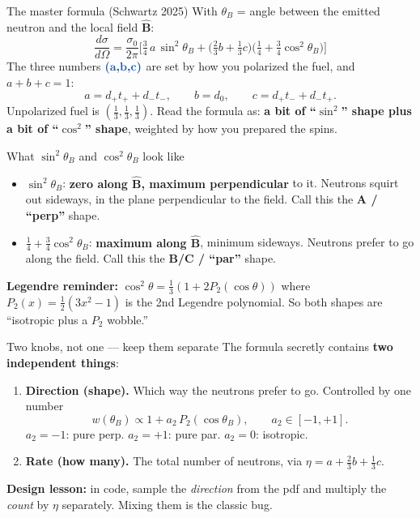 \documentclass[11pt,aspectratio=169]{beamer}
\newcommand{\key}[1]{\textcolor{key}{\textbf{#1}}}
\newcommand{\bhat}{\hat{\mathbf{B}}}
\begin{document}
\begin{frame}{The master formula (Schwartz 2025)}
With $\theta_B$ = angle between the emitted neutron and the local field $\bhat$:
\[ \frac{d\sigma}{d\Omega} = \frac{\sigma_0}{2\pi}\Big[\tfrac34\,a\,\sin^2\theta_B
+ \big(\tfrac23 b + \tfrac13 c\big)\big(\tfrac14+\tfrac34\cos^2\theta_B\big)\Big] \]
The three numbers $\key{(a,b,c)}$ are set by how you polarized the fuel, and $a+b+c=1$:
\[ a = d_+t_+ + d_-t_-,\qquad b = d_0,\qquad c = d_+t_- + d_-t_+ .\]
Unpolarized fuel is $(\tfrac13,\tfrac13,\tfrac13)$. Read the formula as: \key{a bit of
``$\sin^2$'' shape plus a bit of ``$\cos^2$'' shape}, weighted by how you prepared the spins.
\end{frame}

\begin{frame}{What $\sin^2\theta_B$ and $\cos^2\theta_B$ look like}
\begin{itemize}
\item $\sin^2\theta_B$: \key{zero along $\bhat$, maximum perpendicular} to it. Neutrons
squirt out sideways, in the plane perpendicular to the field. Call this the \key{A / ``perp''}
shape.
\item $\tfrac14+\tfrac34\cos^2\theta_B$: \key{maximum along $\bhat$}, minimum sideways.
Neutrons prefer to go along the field. Call this the \key{B/C / ``par''} shape.
\end{itemize}
\key{Legendre reminder:} $\cos^2\theta = \tfrac13(1+2P_2(\cos\theta))$ where
$P_2(x)=\tfrac12(3x^2-1)$ is the 2nd Legendre polynomial. So both shapes are ``isotropic plus
a $P_2$ wobble.''
\end{frame}

\begin{frame}{Two knobs, not one --- keep them separate}
The formula secretly contains \key{two independent things}:
\begin{enumerate}
\item \key{Direction (shape).} Which way the neutrons prefer to go. Controlled by one number
\[ w(\theta_B)\propto 1 + a_2\,P_2(\cos\theta_B),\qquad a_2\in[-1,+1].\]
$a_2=-1$: pure perp. $a_2=+1$: pure par. $a_2=0$: isotropic.
\item \key{Rate (how many).} The total number of neutrons, via
$\eta = a + \tfrac23 b + \tfrac13 c$.
\end{enumerate}
\key{Design lesson:} in code, sample the \emph{direction} from the pdf and multiply the
\emph{count} by $\eta$ separately. Mixing them is the classic bug.
\end{frame}
\end{document}
